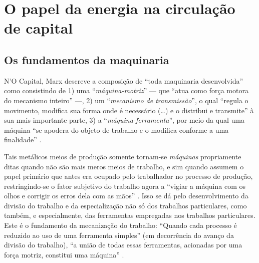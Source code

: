 \chapter{O papel da energia na circulação de capital}


\hypertarget{os-fundamentos-da-maquinaria}{%
\section{Os fundamentos da maquinaria}\label{os-fundamentos-da-maquinaria}}

N'O Capital, Marx descreve a composição de ``toda maquinaria desenvolvida'' como consistindo de 1) uma ``\textit{máquina-motriz}'' --- que ``atua como força motora do mecanismo inteiro'' ---, 2) um ``\textit{mecanismo de transmissão}'', o qual ``regula o movimento, modifica sua forma onde é necessário (\ldots) e o distribui e transmite'' à sua mais importante parte, 3) a ``\textit{máquina-ferramenta}'', por meio da qual uma máquina ``se apodera do objeto de trabalho e o modifica conforme a uma finalidade'' \parencite[, p. 446-7, grifo meu]{Marx2017}.

Tais metálicos meios de produção somente tornam-se \textit{máquinas} propriamente ditas quando não são mais meros meios de trabalho, e sim quando assumem o papel primário que antes era ocupado pelo trabalhador no processo de produção, restringindo-se o fator subjetivo do trabalho agora a ``vigiar a máquina com os olhos e corrigir os erros dela com as mãos'' \parencite[, p. 448]{Marx2017}. Isso se dá pelo desenvolvimento da divisão do trabalho e da especialização não só dos trabalhos particulares, como também, e especialmente, das ferramentas empregadas nos trabalhos particulares. Este é o fundamento da mecanização do trabalho: ``Quando cada processo é reduzido ao uso de uma ferramenta simples'' (em decorrência do avanço da divisão do trabalho), ``a união de todas essas ferramentas, acionadas por uma força motriz, constitui uma máquina'' \parencite[, p. 136 (§167)]{Babbage2009}.

